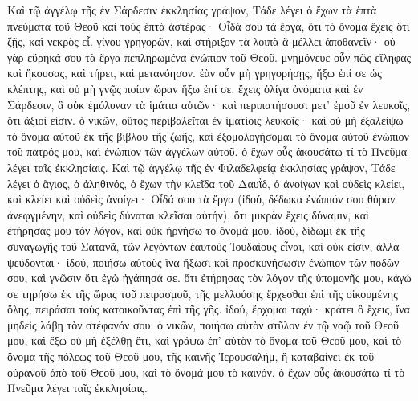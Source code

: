 \begin{pages}
    \begin{Leftside}
        \beginnumbering
		Καὶ τῷ ἀγγέλῳ τῆς ἐν Σάρδεσιν ἐκκλησίας γράψον, Tάδε λέγει ὁ ἔχων τὰ ἑπτὰ πνεύματα τοῦ Θεοῦ καὶ τοὺς ἑπτὰ ἀστέρας· Oἶδά σου τὰ ἔργα, ὅτι τὸ ὄνομα ἔχεις ὅτι ζῇς, καὶ νεκρὸς εἶ. γίνου γρηγορῶν, καὶ στήριξον τὰ λοιπὰ ἃ μέλλει ἀποθανεῖν· οὐ γὰρ εὕρηκά σου τὰ ἔργα πεπληρωμένα ἐνώπιον τοῦ Θεοῦ. μνημόνευε οὖν πῶς εἴληφας καὶ ἤκουσας, καὶ τήρει, καὶ μετανόησον. ἐὰν οὖν μὴ γρηγορήσῃς, ἥξω ἐπί σε ὡς κλέπτης, καὶ οὐ μὴ γνῷς ποίαν ὥραν ἥξω ἐπί σε.
		\pend
		\pstart
		ἔχεις ὀλίγα ὀνόματα καὶ ἐν Σάρδεσιν, ἃ οὐκ ἐμόλυναν τὰ ἱμάτια αὐτῶν· καὶ περιπατήσουσι μετ’ ἐμοῦ ἐν λευκοῖς, ὅτι ἄξιοί εἰσιν. ὁ νικῶν, οὕτος περιβαλεῖται ἐν ἱματίοις λευκοῖς· καὶ οὐ μὴ ἐξαλείψω τὸ ὄνομα αὐτοῦ ἐκ τῆς βίβλου τῆς ζωῆς, καὶ ἐξομολογήσομαι τὸ ὄνομα αὐτοῦ ἐνώπιον τοῦ πατρός μου, καὶ ἐνώπιον τῶν ἀγγέλων αὐτοῦ. ὁ ἔχων οὖς ἀκουσάτω τί τὸ Πνεῦμα λέγει ταῖς ἐκκλησίαις.
		\pend
		\pstart
		Καὶ τῷ ἀγγέλῳ τῆς ἐν Φιλαδελφείᾳ ἐκκλησίας γράψον, Τάδε λέγει ὁ ἅγιος, ὁ ἀληθινός, ὁ ἔχων τὴν κλεῖδα τοῦ Δαυῒδ, ὁ ἀνοίγων καὶ οὐδεὶς κλείει, καὶ κλείει καὶ οὐδεὶς ἀνοίγει· Οἶδά σου τὰ ἔργα (ἰδού, δέδωκα ἐνώπιόν σου θύραν ἀνεῳγμένην, καὶ οὐδεὶς δύναται κλεῖσαι αὐτήν), ὅτι μικρὰν ἔχεις δύναμιν, καὶ ἐτήρησάς μου τὸν λόγον, καὶ οὐκ ἠρνήσω τὸ ὄνομά μου. ἰδού, δίδωμι ἐκ τῆς συναγωγῆς τοῦ Σατανᾶ, τῶν λεγόντων ἑαυτοὺς Ἰουδαίους εἶναι, καὶ οὐκ εἰσὶν, ἀλλὰ ψεύδονται· ἰδού, ποιήσω αὐτοὺς ἵνα ἥξωσι καὶ προσκυνήσωσιν ἐνώπιον τῶν ποδῶν σου, καὶ γνῶσιν ὅτι ἐγὼ ἠγάπησά σε. ὅτι ἐτήρησας τὸν λόγον τῆς ὑπομονῆς μου, κἀγώ σε τηρήσω ἐκ τῆς ὥρας τοῦ πειρασμοῦ, τῆς μελλούσης ἔρχεσθαι ἐπὶ τῆς οἰκουμένης ὅλης, πειράσαι τοὺς κατοικοῦντας ἐπὶ τῆς γῆς. ἰδού, ἔρχομαι ταχύ· κράτει ὃ ἔχεις, ἵνα μηδεὶς λάβῃ τὸν στέφανόν σου. ὁ νικῶν, ποιήσω αὐτὸν στῦλον ἐν τῷ ναῷ τοῦ Θεοῦ μου, καὶ ἔξω οὐ μὴ ἐξέλθῃ ἔτι, καὶ γράψω ἐπ’ αὐτὸν τὸ ὄνομα τοῦ Θεοῦ μου, καὶ τὸ ὄνομα τῆς πόλεως τοῦ Θεοῦ μου, τῆς καινῆς Ἰερουσαλήμ, ἣ καταβαίνει ἐκ τοῦ οὐρανοῦ ἀπὸ τοῦ Θεοῦ μου, καὶ τὸ ὄνομά μου τὸ καινόν. ὁ ἔχων οὖς ἀκουσάτω τί τὸ Πνεῦμα λέγει ταῖς ἐκκλησίαις.
		\pend
		\pstart

\end{Leftside}
\end{pages}
